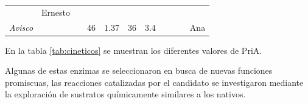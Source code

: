 \documentclass[12pt,twoside]{reedthesis}
\begin{document}
\begin{longtable}[]{@{}lllllllllll@{}}
\begin{minipage}[t]{0.03\columnwidth}
  \strut
  \end{minipage} & \begin{minipage}[t]{0.11\columnwidth}\raggedright\strut
  Ernesto\strut
  \end{minipage}\tabularnewline
  \begin{minipage}[t]{0.15\columnwidth}\raggedright\strut
  \emph{Avisco}\strut
  \end{minipage} & \begin{minipage}[t]{0.05\columnwidth}\raggedright\strut
  \strut
  \end{minipage} & \begin{minipage}[t]{0.04\columnwidth}\raggedright\strut
  \strut
  \end{minipage} & \begin{minipage}[t]{0.04\columnwidth}\raggedright\strut
  46\strut
  \end{minipage} & \begin{minipage}[t]{0.06\columnwidth}\raggedright\strut
  1.37\strut
  \end{minipage} & \begin{minipage}[t]{0.06\columnwidth}\raggedright\strut
  36\strut
  \end{minipage} & \begin{minipage}[t]{0.06\columnwidth}\raggedright\strut
  3.4\strut
  \end{minipage} & \begin{minipage}[t]{0.05\columnwidth}\raggedright\strut
  \strut
  \end{minipage} & \begin{minipage}[t]{0.05\columnwidth}\raggedright\strut
  \strut
  \end{minipage} & \begin{minipage}[t]{0.03\columnwidth}\raggedright\strut
  \strut
  \end{minipage} & \begin{minipage}[t]{0.11\columnwidth}\raggedright\strut
  Ana\strut
  \end{minipage}\tabularnewline
  \bottomrule
  \end{longtable}
  
  En la tabla \autoref{tab:cineticos} se muestran los diferentes valores
  de PriA.
  
  Algunas de estas enzimas se seleccionaron en busca de nuevas funciones
  promiscuas, las reacciones catalizadas por el candidato se investigaron
  mediante la exploración de sustratos químicamente similares a los
  nativos.
  
\end{document}
